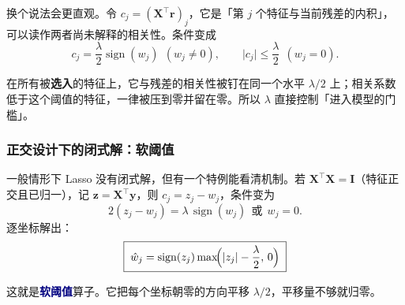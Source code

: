 \documentclass[11pt,a4paper,fontset=windows,zihao=-4]{ctexart}
\newcommand{\bX}{\mathbf{X}}
\newcommand{\by}{\mathbf{y}}
\newcommand{\bz}{\mathbf{z}}
\newcommand{\bI}{\mathbf{I}}
\newcommand{\tp}{^{\top}}
\newcommand{\abs}[1]{\lvert #1\rvert}
\DeclareMathOperator{\sign}{sign}
\newcommand{\hl}[1]{\textcolor{navy}{\textbf{#1}}}
\begin{document}
换个说法会更直观。令 $c_j=(\bX\tp\mathbf r)_j$，它是「第 $j$ 个特征与当前残差的内积」，可以读作两者尚未解释的相关性。条件变成
\begin{equation}
  c_j=\frac{\lambda}{2}\sign(w_j)\ \ (w_j\ne0),
  \qquad
  \abs{c_j}\le\frac{\lambda}{2}\ \ (w_j=0).
\end{equation}

\begin{keybox}
在所有被\textbf{选入}的特征上，它与残差的相关性被钉在同一个水平 $\lambda/2$ 上；相关系数低于这个阈值的特征，一律被压到零并留在零。所以 $\lambda$ 直接控制「进入模型的门槛」。
\end{keybox}

\subsubsection{正交设计下的闭式解：软阈值}

一般情形下 Lasso 没有闭式解，但有一个特例能看清机制。若 $\bX\tp\bX=\bI$（特征正交且已归一），记 $\bz=\bX\tp\by$，则 $c_j=z_j-w_j$，条件变为
\begin{equation}
  2(z_j-w_j)=\lambda\,\sign(w_j)\ \ \text{或}\ \ w_j=0 .
\end{equation}
逐坐标解出：
\begin{equation}
  \boxed{\;\hat w_j=\sign(z_j)\max\!\Bigl(\abs{z_j}-\frac{\lambda}{2},\,0\Bigr)\;}
  \label{eq:soft}
\end{equation}

这就是\hl{软阈值}算子。它把每个坐标朝零的方向平移 $\lambda/2$，平移量不够就归零。
\end{document}
